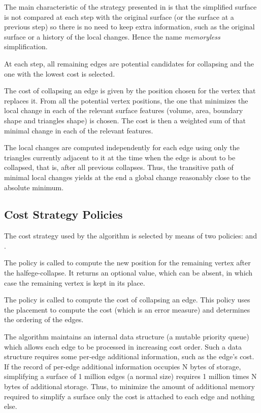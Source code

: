The main characteristic of the strategy presented in
\cite{cgal:lt-fmeps-98,cgal:lt-ems-99} is that the simplified surface
is not compared at each step with the original surface (or the surface
at a previous step) so there is no need to keep extra information,
such as the original surface or a history of the local changes. Hence
the name {\em memoryless} simplification.

At each step, all remaining edges are potential candidates for 
collapsing and the one with the lowest cost is selected.

The cost of collapsing an edge is given by the position chosen for the
vertex that replaces it. From all the potential vertex positions, the
one that minimizes the local change in each of the relevant surface
features (volume, area, boundary shape and triangles shape) is
chosen. The cost is then a weighted sum of that minimal change in each
of the relevant features.

The local changes are computed independently for each edge using only
the triangles currently adjacent to it at the time when the edge 
is about to be collapsed, that is, after all previous collapses.
Thus, the transitive path of minimal local changes yields at
the end a global change reasonably close to the absolute minimum.

\subsection{Cost Strategy Policies}

The cost strategy used by the algorithm is selected by means of two policies: 
 and . 

The  policy is called to compute the new position
for the remaining vertex after the halfege-collapse. It returns
an optional value, which can be absent, in which case the 
remaining vertex is kept in its place.

The  policy is called to compute the cost
of collapsing an edge. This policy uses the placement to compute
the cost (which is an error measure) and determines the 
ordering of the edges.

The algorithm maintains an internal data structure (a mutable priority queue)
which allows each edge to be processed in increasing cost order. Such a data structure
requires some per-edge additional information, such as the edge's cost.
If the record of per-edge additional information occupies N bytes of storage,
simplifying a surface of 1 million edges (a normal size) requires 1 million times N bytes
of additional storage. Thus, to minimize the amount of additional memory required to
simplify a surface only the cost is attached to each edge and nothing else.


